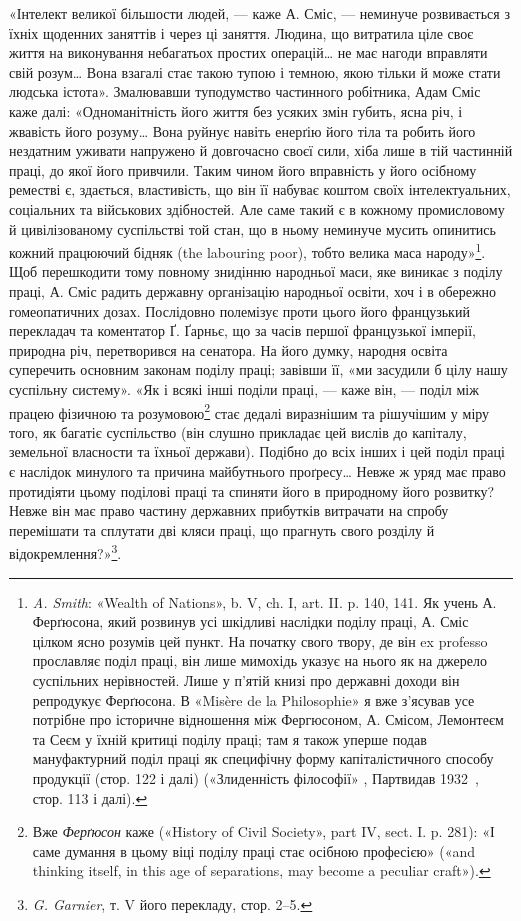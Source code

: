 «Інтелект великої більшости людей, — каже А. Сміс, — неминуче
розвивається з їхніх щоденних заняттів і через ці заняття.
Людина, що витратила ціле своє життя на виконування небагатьох
простих операцій\dots{} не має нагоди вправляти свій розум\dots{} Вона
взагалі стає такою тупою і темною, якою тільки й може стати
людська істота». Змалювавши туподумство частинного робітника,
Адам Сміс каже далі: «Одноманітність його життя без усяких
змін губить, ясна річ, і жвавість його розуму\dots{} Вона руйнує
навіть енерґію його тіла та робить його нездатним уживати напружено
й довгочасно своєї сили, хіба лише в тій частинній
праці, до якої його привчили. Таким чином його вправність у його
осібному реместві є, здається, властивість, що він її набуває коштом
своїх інтелектуальних, соціальних та військових здібностей.
Але саме такий є в кожному промисловому й цивілізованому
суспільстві той стан, що в ньому неминуче мусить опинитись
кожний працюючий бідняк (the labouring poor), тобто велика маса
народу»\footnote{
\emph{A. Smith}: «Wealth of Nations», b. V, ch. I, art. II. p. 140, 141.
Як учень А. Ферґюсона, який розвинув усі шкідливі наслідки поділу
праці, А. Сміс цілком ясно розумів цей пункт. На початку свого твору,
де він ex professo прославляє поділ праці, він лише мимохідь указує на
нього як на джерело суспільних нерівностей. Лише у п’ятій книзі про
державні доходи він репродукує Ферґюсона. В «Misère de la Philosophie»
я вже з’ясував усе потрібне про історичне відношення між Фергюсоном,
А. Смісом, Лемонтеєм та Сеєм у їхній критиці поділу праці; там
я також уперше подав мануфактурний поділ праці як специфічну форму
капіталістичного способу продукції (стор. 122 і далі) («Злиденність філософії»
, Партвидав 1932~, стор. 113 і далі).
}. Щоб перешкодити тому повному знидінню народньої
маси, яке виникає з поділу праці, А. Сміс радить державну
організацію народньої освіти, хоч і в обережно гомеопатичних
дозах. Послідовно полемізує проти цього його французький
перекладач та коментатор Ґ. Ґарньє, що за часів першої французької
імперії, природна річ, перетворився на сенатора. На його
думку, народня освіта суперечить основним законам поділу праці;
завівши її, «ми засудили б цілу нашу суспільну систему». «Як
і всякі інші поділи праці, — каже він, — поділ між працею фізичною
та розумовою\footnote{
Вже \emph{Ферґюсон} каже («History of Civil Society», part IV, sect. I.
p. 281): «І саме думання в цьому віці поділу праці стає осібною професією»
(«and thinking itself, in this age of separations, may become a peculiar
craft»).
} стає дедалі виразнішим та рішучішим у
міру того, як багатіє суспільство (він слушно прикладає цей
вислів до капіталу, земельної власности та їхньої держави).
Подібно до всіх інших і цей поділ праці є наслідок минулого та
причина майбутнього проґресу\dots{} Невже ж уряд має право протидіяти
цьому поділові праці та спиняти його в природному його
розвитку? Невже він має право частину державних прибутків
витрачати на спробу перемішати та сплутати дві кляси праці,
що прагнуть свого розділу й відокремлення?»\footnote{
\emph{G. Garnier}, т. V його перекладу, стор. 2--5.
}.

